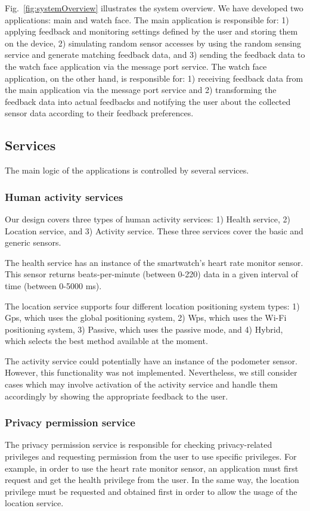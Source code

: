 \documentclass[conference, a4paper, 10pt, twocolumn]{IEEEtran}
\begin{document}
Fig.~\ref{fig:systemOverview} illustrates the system overview. We have developed two applications: main and watch face. The main application is responsible for: 1) applying feedback and monitoring settings defined by the user and storing them on the device, 2) simulating random sensor accesses by using the random sensing service and generate matching feedback data, and 3) sending the feedback data to the watch face application via the message port service. The watch face application, on the other hand, is responsible for: 1) receiving feedback data from the main application via the message port service and 2) transforming the feedback data into actual feedbacks and notifying the user about the collected sensor data according to their feedback preferences.

\subsection{Services}\label{services}
The main logic of the applications is controlled by several services.

\subsubsection{Human activity services}
Our design covers three types of human activity services: 1) Health service, 2) Location service, and 3) Activity service. These three services cover the basic and generic sensors.

The health service has an instance of the smartwatch's heart rate monitor sensor. This sensor returns beats-per-minute (between 0-220) data in a given interval of time (between 0-5000 ms).

The location service supports four different location positioning system types: 1) Gps, which uses the global positioning system, 2) Wps, which uses the Wi-Fi positioning system, 3) Passive, which uses the passive mode, and 4) Hybrid, which selects the best method available at the moment. 

The activity service could potentially have an instance of the podometer sensor. However, this functionality was not implemented. Nevertheless, we still consider cases which may involve activation of the activity service and handle them accordingly by showing the appropriate feedback to the user. 

\subsubsection{Privacy permission service}
The privacy permission service is responsible for checking privacy-related privileges and requesting permission from the user to use specific privileges. For example, in order to use the heart rate monitor sensor, an application must first request and get the health privilege from the user. In the same way, the location privilege must be requested and obtained first in order to allow the usage of the location service.
\end{document}
